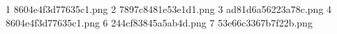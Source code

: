 1 8604e4f3d77635c1.png
2 7897c8481e53e1d1.png
3 ad81d6a56223a78c.png
4 8604e4f3d77635c1.png
6 244cf83845a5ab4d.png
7 53e66c3367b7f22b.png
